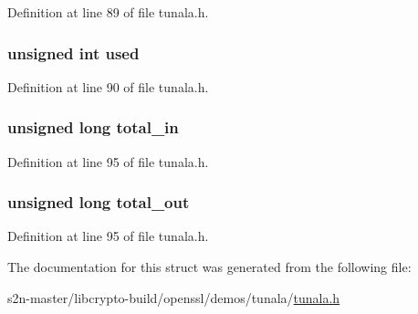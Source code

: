Definition at line 89 of file tunala.\+h.

\subsubsection[{\texorpdfstring{used}{used}}]{\setlength{\rightskip}{0pt plus 5cm}unsigned int used}\hypertarget{struct__buffer__t_a2590a5f33b83235fcf8740d3bb9b0e98}{}\label{struct__buffer__t_a2590a5f33b83235fcf8740d3bb9b0e98}


Definition at line 90 of file tunala.\+h.

\subsubsection[{\texorpdfstring{total\+\_\+in}{total_in}}]{\setlength{\rightskip}{0pt plus 5cm}unsigned long total\+\_\+in}\hypertarget{struct__buffer__t_ad4709f433ecfd17bc59938f62793bfc6}{}\label{struct__buffer__t_ad4709f433ecfd17bc59938f62793bfc6}


Definition at line 95 of file tunala.\+h.

\subsubsection[{\texorpdfstring{total\+\_\+out}{total_out}}]{\setlength{\rightskip}{0pt plus 5cm}unsigned long total\+\_\+out}\hypertarget{struct__buffer__t_a36fccd25e68cfdb8a1e2745a47e03ce1}{}\label{struct__buffer__t_a36fccd25e68cfdb8a1e2745a47e03ce1}


Definition at line 95 of file tunala.\+h.



The documentation for this struct was generated from the following file\+:\begin{DoxyCompactItemize}
\item 
s2n-\/master/libcrypto-\/build/openssl/demos/tunala/\hyperlink{tunala_8h}{tunala.\+h}\end{DoxyCompactItemize}
